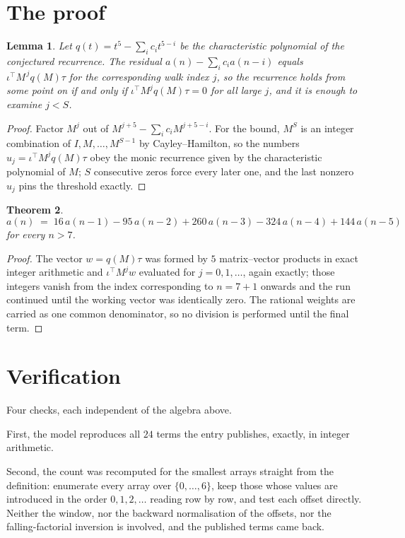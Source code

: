 \documentclass[11pt,a4paper]{article}
\theoremstyle{plain}
\newtheorem{theorem}{Theorem}
\newtheorem{lemma}[theorem]{Lemma}
\theoremstyle{definition}
\begin{document}
\section{The proof}

\begin{lemma}\label{lem:crit}
Let $q(t)=t^{5}-\sum_i c_it^{5-i}$ be the characteristic polynomial of the
conjectured recurrence. The residual $a(n)-\sum_ic_ia(n-i)$ equals
$\iota^{\!\top}M^{\,j}q(M)\tau$ for the corresponding walk index $j$, so the recurrence
holds from some point on if and only if $\iota^{\!\top}M^{j}q(M)\tau=0$ for all large $j$,
and it is enough to examine $j<S$.
\end{lemma}

\begin{proof}
Factor $M^{j}$ out of $M^{j+5}-\sum_ic_iM^{j+5-i}$. For the bound, $M^{S}$
is an integer combination of $I,M,\dots,M^{S-1}$ by Cayley--Hamilton, so the numbers
$u_j=\iota^{\!\top}M^{j}q(M)\tau$ obey the monic recurrence given by the characteristic
polynomial of $M$; $S$ consecutive zeros force every later one, and the last nonzero $u_j$
pins the threshold exactly.
\end{proof}

\begin{theorem}
\[
a(n)\;=\;16\,a(n-1) - 95\,a(n-2) + 260\,a(n-3) - 324\,a(n-4) + 144\,a(n-5)
\]
for every $n>7$.
\end{theorem}

\begin{proof}
The vector $w=q(M)\tau$ was formed by $5$ matrix--vector products in exact integer
arithmetic and $\iota^{\!\top}M^{j}w$ evaluated for $j=0,1,\dots$, again exactly; those
integers vanish from the index corresponding to $n=7+1$ onwards and the run continued
until the working vector was identically zero. The rational weights are carried as one common
denominator, so no division is performed until the final term.
\end{proof}

\section{Verification}

Four checks, each independent of the algebra above.

First, the model reproduces all $24$ terms the entry publishes, exactly, in integer
arithmetic.

Second, the count was recomputed for the smallest arrays straight from the definition:
enumerate every array over $\{0,\dots,6\}$, keep those whose values are introduced in the
order $0,1,2,\dots$ reading row by row, and test each offset directly. Neither the window, nor
the backward normalisation of the offsets, nor the falling-factorial inversion is involved, and
the published terms came back.
\end{document}
